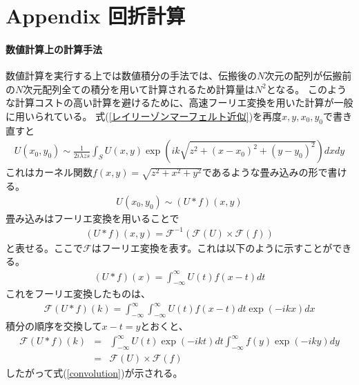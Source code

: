 \documentclass[a4paper,11pt,uplatex]{jsbook}
\begin{document}
\chapter*{Appendix 回折計算}
\renewcommand{\theequation}{A.\arabic{equation}}
\setcounter{equation}{0}
\subsubsection{数値計算上の計算手法}

数値計算を実行する上では数値積分の手法では、伝搬後の$N$次元の配列が伝搬前の$N$次元配列全ての積分を用いて計算されるため計算量は$N^2$となる。
このような計算コストの高い計算を避けるために、高速フーリエ変換を用いた計算が一般に用いられている。
式(\ref{レイリーゾンマーフェルト近似})を再度$x,y,x_0,y_0$で書き直すと
\begin{eqnarray}
  U(x_0,y_0) \sim \frac{1}{2i\lambda zs}\int_S U(x,y) \exp( ik \sqrt{z^2 + (x-x_0)^2 + (y-y_0)^2}) dxdy
\end{eqnarray}
これはカーネル関数$f(x,y) = \sqrt{z^2 +x^2 + y^2}$であるような畳み込みの形で書ける。
\begin{eqnarray}
  U(x_0,y_0) \sim (U * f)(x,y)
\end{eqnarray}
畳み込みはフーリエ変換を用いることで
\begin{eqnarray}
  (U*f)(x,y) = \mathcal{F}^{-1}(\mathcal{F}(U) \times \mathcal{F}(f)) \label{convolution}
\end{eqnarray}
と表せる。ここで$\mathcal{F}$はフーリエ変換を表す。これは以下のように示すことができる。
\begin{eqnarray}
  (U*f)(x) = \int_{-\infty}^{\infty} U(t)f(x-t)dt
\end{eqnarray}
これをフーリエ変換したものは、
\begin{eqnarray}
  \mathcal{F}(U*f)(k) = \int_{-\infty}^{\infty} \int_{-\infty}^{\infty} U(t)f(x-t)dt \exp(-ikx)dx
\end{eqnarray}
積分の順序を交換して$x-t = y$とおくと、
\begin{eqnarray}
  \mathcal{F}(U*f)(k) &=& \int_{-\infty}^{\infty} U(t) \exp(-ikt)dt \int_{-\infty}^{\infty} f(y) \exp(-iky)dy\\
  &=& \mathcal{F}(U) \times \mathcal{F}(f)
\end{eqnarray}
したがって式(\ref{convolution})が示される。
\end{document}
